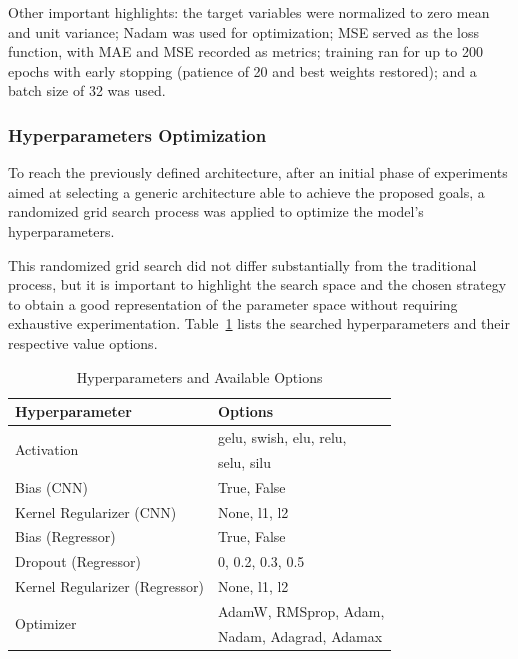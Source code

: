 \documentclass[10pt,conference]{IEEEtran}
\begin{document}
Other important highlights: the target variables were normalized to zero mean and unit variance; Nadam was used for optimization; MSE served as the loss function, with MAE and MSE recorded as metrics; training ran for up to 200 epochs with early stopping (patience of 20 and best weights restored); and a batch size of 32 was used.

\subsubsection{Hyperparameters Optimization}

To reach the previously defined architecture, after an initial phase of experiments aimed at selecting a generic architecture able to achieve the proposed goals, a randomized grid search process was applied to optimize the model’s hyperparameters.

This randomized grid search did not differ substantially from the traditional process, but it is important to highlight the search space and the chosen strategy to obtain a good representation of the parameter space without requiring exhaustive experimentation. Table~\ref{tab:hyperparams_options} lists the searched hyperparameters and their respective value options.


\begin{table} \small \centering
  \caption{Hyperparameters and Available Options}
  \label{tab:hyperparams_options}
\begin{tabular*}{\columnwidth}
    {@{\extracolsep{\fill}}ll}
    \toprule
    Hyperparameter & Options \\
    \midrule
    \multirow{2}{*}{Activation} & gelu, swish, elu, relu,  \\
    & selu, silu \\
    Bias (CNN) & True, False \\
    Kernel Regularizer (CNN) & None, l1, l2 \\
    Bias (Regressor) & True, False \\
    Dropout (Regressor) & 0, 0.2, 0.3, 0.5 \\
    Kernel Regularizer (Regressor) & None, l1, l2 \\
    \multirow{2}{*}{Optimizer} & AdamW, RMSprop, Adam, \\
    & Nadam, Adagrad, Adamax \\
    \bottomrule
  \end{tabular*}
\end{table}
\end{document}
